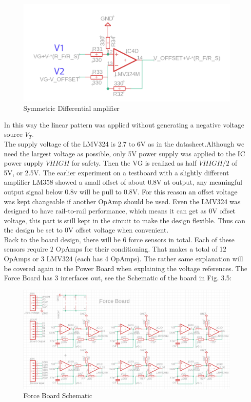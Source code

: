 \documentclass[12 pt, a4paper]{thesis}
\begin{document}
\begin{figure}[hbt!]
\begin{center}
\includegraphics[width = 120mm]{Diff.png}
\end{center}
\caption{Symmetric Differential amplifier}
\end{figure}
In this way the linear pattern was applied without generating a negative voltage source $V_T$.\\
The supply voltage of the LMV324 is 2.7 to 6V as in the datasheet\cite{lmv324}.Although we need the largest voltage as possible, only 5V power supply was applied to the IC power supply $VHIGH$ for safety. Then the VG is realized as half $VHIGH/2$ of 5V, or 2.5V. The earlier experiment on a testboard with a slightly different amplifier LM358 showed a small offset of about 0.8V at output, any meaningful output signal below 0.8v will be pull to 0.8V. For this reason an offset voltage was kept changeable if another OpAmp should be used. Even the LMV324 was designed to have rail-to-rail performance, which means it can get as 0V offset voltage, this part is still kept in the circuit to make the design flexible. Thus can the design be set to 0V offset voltage when convenient.\\  	
Back to the board design, there will be 6 force sensors in total. Each of these sensors require 2 OpAmps for their conditioning. That makes a total of 12 OpAmps or 3 LMV324 (each has 4 OpAmps). The rather same explanation will be covered again in the Power Board when explaining the voltage references. The Force Board has 3 interfaces out, see the Schematic of the board in Fig. 3.5:
\begin{figure}[hbt!]
\begin{center}
\includegraphics[width = 150mm]{ForceSch.png}
\caption{Force Board Schematic}
\end{center}
\end{figure}
\end{document}

